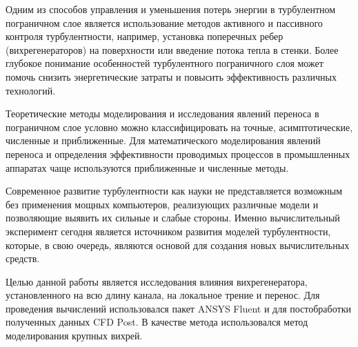 	Одним из способов управления и уменьшения потерь энергии в турбулентном пограничном слое является использование методов активного и пассивного контроля турбулентности, например, установка поперечных ребер (вихрегенераторов) на поверхности или введение потока тепла в стенки. Более глубокое понимание особенностей турбулентного пограничного слоя может помочь снизить энергетические затраты и повысить эффективность различных технологий.
	
	Теоретические методы моделирования и исследования явлений переноса в пограничном слое условно можно классифицировать на точные, асимптотические, численные и приближенные. Для математического моделирования явлений переноса и определения эффективности проводимых процессов в промышленных аппаратах чаще используются приближенные и численные методы.
	
	Современное развитие турбулентности как науки не представляется возможным без применения мощных компьютеров, реализующих различные модели и позволяющие выявить их сильные и слабые стороны. Именно вычислительный эксперимент сегодня является источником развития моделей турбулентности, которые, в свою очередь, являются основой для создания новых вычислительных средств.
	
	Целью данной работы является исследования влияния вихрегенератора, установленного на всю длину канала, на локальное трение и перенос. Для проведения вычислений использовался пакет ANSYS Fluent и для постобработки полученных данных CFD Post. В качестве метода использовался метод моделирования крупных вихрей.
\newpage